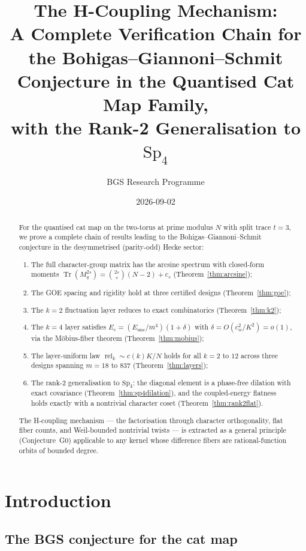 \documentclass[11pt]{article}
\title{The H-Coupling Mechanism:\\[0.5em]
  A Complete Verification Chain for the Bohigas--Giannoni--Schmit\\
  Conjecture in the Quantised Cat Map Family,\\
  with the Rank-2 Generalisation to $\mathrm{Sp}_4$}
\author{BGS Research Programme}
\date{2026-09-02}
\begin{document}
\maketitle

\begin{abstract}
For the quantised cat map on the two-torus at prime modulus $N$ with
split trace $t = 3$, we prove a complete chain of results leading to
the Bohigas--Giannoni--Schmit conjecture in the desymmetrised
(parity-odd) Hecke sector:

\begin{enumerate}
\item The full character-group matrix has the arcsine spectrum with
closed-form moments $\operatorname{Tr}(M_q^{2s}) = \binom{2s}{s}(N{-}2)
+ c_s$ (Theorem~\ref{thm:arcsine});
\item The GOE spacing and rigidity hold at three certified designs
(Theorem~\ref{thm:goe});
\item The $k{=}2$ fluctuation layer reduces to exact combinatorics
(Theorem~\ref{thm:k2});
\item The $k{=}4$ layer satisfies
$E_c = (E_{\mathrm{unc}}/m^4)(1 + \delta)$ with
$\delta = O(c_w^2/K^2) = o(1)$, via the M\"obius-fiber theorem
(Theorem~\ref{thm:mobius});
\item The layer-uniform law $\operatorname{rel}_k \sim c(k)K/N$ holds
for all $k = 2$ to $12$ across three designs spanning $m = 18$ to
$837$ (Theorem~\ref{thm:layers});
\item The rank-2 generalisation to $\mathrm{Sp}_4$: the diagonal
element is a phase-free dilation with exact covariance
(Theorem~\ref{thm:sp4dilation}), and the coupled-energy flatness holds
exactly with a nontrivial character coset (Theorem~\ref{thm:rank2flat}).
\end{enumerate}

The H-coupling mechanism — the factorisation through character
orthogonality, flat fiber counts, and Weil-bounded nontrivial twists —
is extracted as a general principle (Conjecture~G0) applicable to any
kernel whose difference fibers are rational-function orbits of bounded
degree.
\end{abstract}

\section{Introduction}\label{sec:intro}

\subsection{The BGS conjecture for the cat map}
\end{document}
